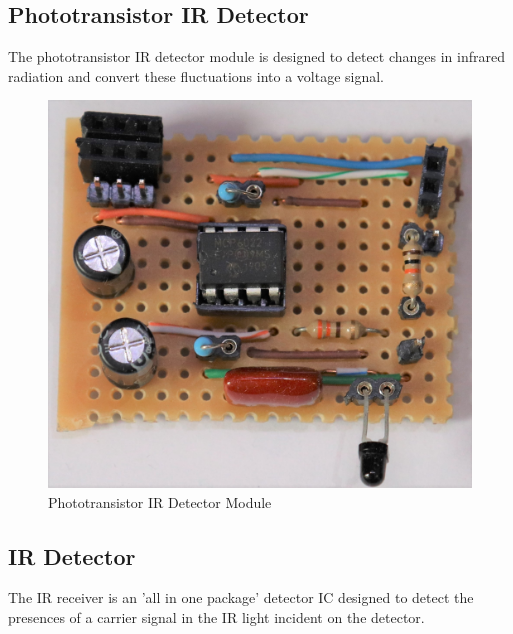 \subsection{Phototransistor IR Detector}


The phototransistor IR detector module is designed to detect changes in infrared radiation and convert these fluctuations into a voltage signal.

\begin{figure}[H]
	\centering
	\includegraphics[width=.6\textwidth]{figures/modules/phototransistor_receiver.jpg}
	\caption{Phototransistor IR Detector Module}
	\label{fig:module_phototransistor_detector}
\end{figure}

\subsection{IR Detector}

The IR receiver is an 'all in one package' detector IC designed to detect the presences of a carrier signal in the IR light incident on the detector.

